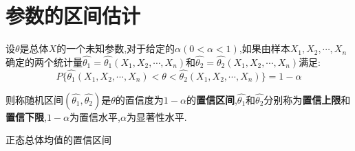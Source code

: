 \section{参数的区间估计}
\begin{definition}[概念]
	设$\theta$是总体$X$的一个未知参数,对于给定的$\alpha(0<\alpha<1)$,如果由样本$X_{1},X_{2},\cdots,X_{n}$确定的两个统计量$\hat{\theta_{1}}=\hat{\theta_{1}}(X_{1},X_{2},\cdots,X_{n})$和$\hat{\theta_{2}}=\hat{\theta_{2}}(X_{1},X_{2},\cdots,X_{n})$满足: 
	$$P\{\hat{\theta_{1}}(X_{1},X_{2},\cdots,X_{n})<\theta<\hat{\theta_{2}}(X_{1},X_{2},\cdots,X_{n})\}=1-\alpha$$
	
	则称随机区间$(\hat{\theta_{1}},\hat{\theta_{2}})$是$\theta$的置信度为$1-\alpha$的\textbf{置信区间},$\hat{\theta_{1}}$和$\hat{\theta_{2}}$分别称为\textbf{置信上限}和\textbf{置信下限},$1-\alpha$为置信水平,$\alpha$为显著性水平.
\end{definition}
\begin{table}[h]
	\centering
	\caption{正态总体均值的置信区间}
	\label{table: 正态总体均值的置信区间}
\end{table}
